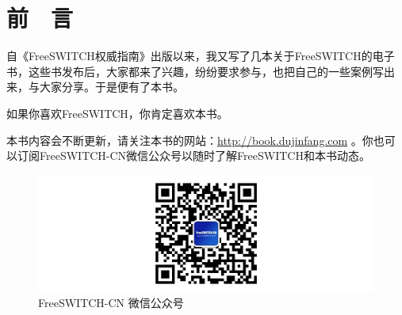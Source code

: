 \chapter*{前　言}\label{ux524dux8a00}

自《FreeSWITCH权威指南》出版以来，我又写了几本关于FreeSWITCH的电子书，这些书发布后，大家都来了兴趣，纷纷要求参与，也把自己的一些案例写出来，与大家分享。于是便有了本书。

如果你喜欢FreeSWITCH，你肯定喜欢本书。

本书内容会不断更新，请关注本书的网站：\url{http://book.dujinfang.com}
。你也可以订阅FreeSWITCH-CN微信公众号以随时了解FreeSWITCH和本书动态。

\begin{figure}[htbp]
\centering
\includegraphics{images/qr-wechat.png}
\caption{FreeSWITCH-CN 微信公众号}
\end{figure}
